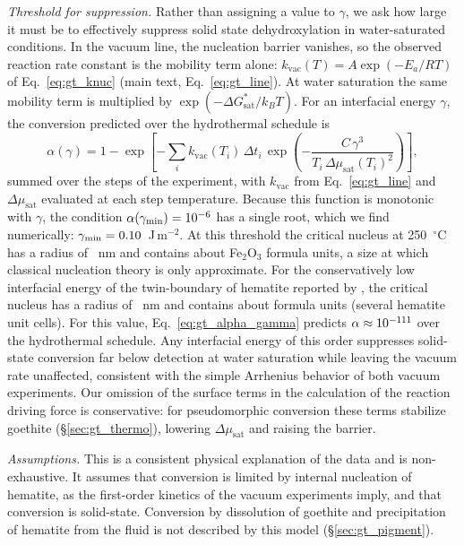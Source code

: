 \textit{Threshold for suppression.} Rather than assigning a value to $\gamma$, we ask how large it
must be to effectively suppress solid state dehydroxylation in water-saturated conditions. 
In the vacuum line, the nucleation barrier vanishes, so the observed 
reaction rate constant is the mobility term alone: $k_{\mathrm{vac}}(T) = A\exp(-E_a/RT)$ of Eq.~\eqref{eq:gt_knuc} 
(main text, Eq.~\eqref{eq:gt_line}). At water saturation the same mobility
term is multiplied by $\exp(-\Delta G^{*}_{\mathrm{sat}}/k_BT)$. 
For an interfacial energy $\gamma$, the conversion predicted over the hydrothermal schedule is
\begin{equation}
  \alpha(\gamma) = 1-\exp\!\left[-\sum_i k_{\mathrm{vac}}(T_i)\,\Delta t_i\,
  \exp\!\left(-\frac{C\,\gamma^{3}}{T_i\,\Delta\mu_{\mathrm{sat}}(T_i)^{2}}\right)\right],
  \label{eq:gt_alpha_gamma}
\end{equation}
summed over the steps of the experiment, with $k_{\mathrm{vac}}$ from Eq.~\eqref{eq:gt_line} and
$\Delta\mu_{\mathrm{sat}}$ evaluated at each step temperature. Because this function is monotonic with $\gamma$,
the condition $\alpha(\gamma_{\min}) = 10^{-6}$ has a single root, which we find numerically:
$\gamma_{\min} = 0.10$~J\,m$^{-2}$. 
At this threshold the critical nucleus at 250~$^\circ$C has a radius of
\ChTwoKinRstarMin~nm and contains about \ChTwoKinNfuMin{} Fe$_2$O$_3$ formula units, a size at which
classical nucleation theory is only approximate. For the conservatively low interfacial energy of the twin-boundary
of hematite reported by \citet{saito2016}, the critical nucleus has a radius of 
\ChTwoKinRstarTwin~nm and contains about \ChTwoKinNfuTwin{} formula units (several hematite unit cells). 
For this value, Eq.~\eqref{eq:gt_alpha_gamma} predicts $\alpha \approx 10^{-111}$ 
over the hydrothermal schedule. 
Any interfacial energy of this order suppresses solid-state conversion far below detection at water
saturation while leaving the vacuum rate unaffected, consistent with the simple Arrhenius behavior of
both vacuum experiments. Our omission of the surface terms in the calculation of the reaction driving force 
is conservative: for pseudomorphic conversion these terms stabilize goethite (\S\ref{sec:gt_thermo}), 
lowering $\Delta\mu_{\mathrm{sat}}$ and raising the barrier.

\textit{Assumptions.} This is a consistent physical explanation of the data and is non-exhaustive. It
assumes that conversion is limited by internal nucleation of hematite, as the first-order kinetics
of the vacuum experiments imply, and that conversion is solid-state. Conversion by
dissolution of goethite and precipitation of hematite from the fluid is not described by this model
(\S\ref{sec:gt_pigment}).

